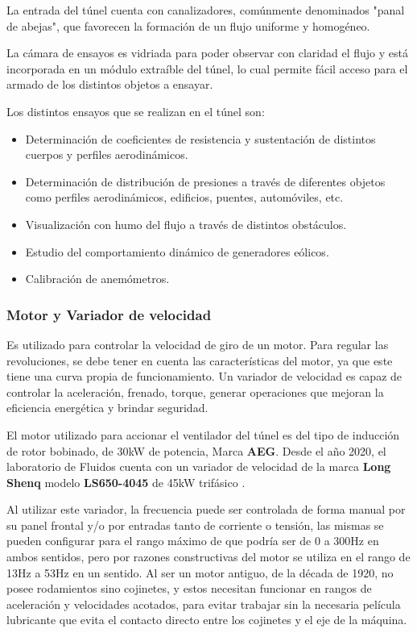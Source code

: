 	La entrada del túnel cuenta con canalizadores, comúnmente denominados "panal de abejas", que favorecen la formación de un flujo uniforme y homogéneo.
	
	La cámara de ensayos es vidriada para poder observar con claridad el flujo y está incorporada en un módulo extraíble del túnel, lo cual permite fácil acceso para el armado de los distintos objetos a ensayar.
	
	Los distintos ensayos que se realizan en el túnel son:
	\begin{itemize}
		\item  Determinación de coeficientes de resistencia y sustentación de distintos cuerpos y perfiles aerodinámicos. 
		\item Determinación de distribución de presiones a través de diferentes objetos como perfiles aerodinámicos, edificios, puentes, automóviles, etc.
		\item Visualización con humo del flujo a través de distintos obstáculos.
		\item Estudio del comportamiento dinámico de generadores eólicos. 
		\item Calibración de anemómetros.
	\end{itemize}

	\subsubsection{Motor y Variador de velocidad}
		\begin{tcolorbox}[colback=blue!5!white,colframe=blue!75!black,title=Variador de velocidad]
			Es utilizado para controlar la velocidad de giro de un motor. Para regular las revoluciones, se debe tener en cuenta las características del motor, ya que este tiene  una  curva  propia  de  funcionamiento. 
			Un variador de velocidad es capaz de controlar la aceleración, frenado, torque, generar operaciones que mejoran la eficiencia energética y brindar seguridad.\end{tcolorbox}	

El motor utilizado para accionar el ventilador del túnel es del tipo de inducción de rotor bobinado, de 30kW de potencia, Marca \textbf{AEG}\cite{barila1993desarrollo}. Desde el año 2020, el laboratorio de Fluidos cuenta con un variador de velocidad de la marca \textbf{Long Shenq} modelo \textbf{LS650-4045} de 45kW trifásico \cite{LS650}.
 
Al utilizar este variador, la frecuencia puede ser controlada de forma manual por su panel frontal y/o por entradas tanto de corriente o tensión, las mismas se pueden configurar para el rango máximo de que podría ser de 0 a 300Hz en ambos sentidos, pero por razones constructivas del motor se utiliza en el rango de 13Hz a 53Hz en un sentido. Al ser un motor antiguo, de la década de 1920, no posee rodamientos sino cojinetes, y estos necesitan funcionar en rangos de aceleración y velocidades acotados, para evitar trabajar sin la necesaria película lubricante que evita el contacto directo entre los cojinetes y el eje de la máquina.


